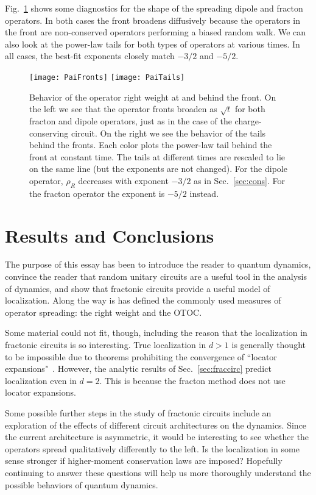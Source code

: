 \documentclass[a4paper,11pt]{article}
\begin{document}
Fig.~\ref{fig:PaiTails} shows some diagnostics for the shape of the spreading dipole and fracton operators. In both cases the front broadens diffusively because the operators in the front are non-conserved operators performing a biased random walk. We can also look at the power-law tails for both types of operators at various times. In all cases, the best-fit exponents closely match $-3/2$ and $-5/2$.
\begin{figure}
	\centering
	\texttt{[image: PaiFronts]}
	\texttt{[image: PaiTails]}
	\caption{Behavior of the operator right weight at and behind the front. 
		On the left we see that the operator fronts broaden as $\sqrt{t}$ for both fracton and dipole operators, just as in the case of the charge-conserving circuit.
		On the right we see the behavior of the tails behind the fronts. Each color plots the power-law tail behind the front at constant time. The tails at different times are rescaled to lie on the same line (but the exponents are not changed). For the dipole operator, $\rho_R$ decreases with exponent $-3/2$ as in Sec.~\ref{sec:cons}. For the fracton operator the exponent is $-5/2$ instead. }
	\label{fig:PaiTails}
\end{figure}


\section{Results and Conclusions} \label{sec:conc}

The purpose of this essay has been to introduce the reader to quantum dynamics, convince the reader that random unitary circuits are a useful tool in the analysis of dynamics, and show that fractonic circuits provide a useful model of localization. Along the way is has defined the commonly used measures of operator spreading: the right weight and the OTOC.

Some material could not fit, though, including the reason that the localization in fractonic circuits is so interesting. True localization in $d>1$ is generally thought to be impossible due to theorems prohibiting the convergence of ``locator expansions"~\cite{PaiFracton}. However, the analytic results of Sec.~\ref{sec:fraccirc} predict localization even in $d=2$. This is because the fracton method does not use locator expansions.

Some possible further steps in the study of fractonic circuits include an exploration of the effects of different circuit architectures on the dynamics. Since the current architecture is asymmetric, it would be interesting to see whether the operators spread qualitatively differently to the left. Is the localization in some sense stronger if higher-moment conservation laws are imposed? Hopefully continuing to answer these questions will help us more thoroughly understand the possible behaviors of quantum dynamics.
\end{document}
